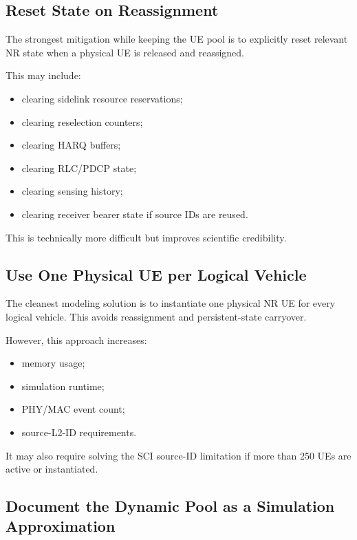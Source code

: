 \documentclass[11pt]{article}
\begin{document}
\subsection{Reset State on Reassignment}

The strongest mitigation while keeping the UE pool is to explicitly reset relevant NR state when a physical UE is released and reassigned.

This may include:

\begin{itemize}
    \item clearing sidelink resource reservations;
    \item clearing reselection counters;
    \item clearing HARQ buffers;
    \item clearing RLC/PDCP state;
    \item clearing sensing history;
    \item clearing receiver bearer state if source IDs are reused.
\end{itemize}

This is technically more difficult but improves scientific credibility.

\subsection{Use One Physical UE per Logical Vehicle}

The cleanest modeling solution is to instantiate one physical NR UE for every logical vehicle. This avoids reassignment and persistent-state carryover.

However, this approach increases:

\begin{itemize}
    \item memory usage;
    \item simulation runtime;
    \item PHY/MAC event count;
    \item source-L2-ID requirements.
\end{itemize}

It may also require solving the SCI source-ID limitation if more than 250 UEs are active or instantiated.

\subsection{Document the Dynamic Pool as a Simulation Approximation}
\end{document}
